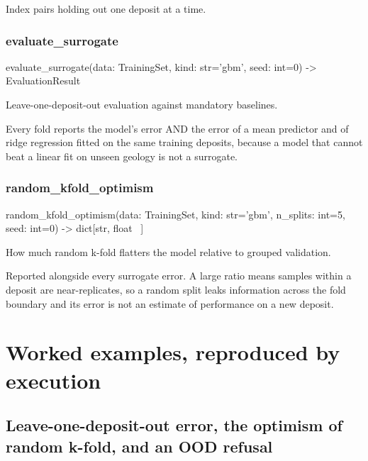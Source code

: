 \documentclass[10pt,a4paper,twoside]{report}
\begin{document}
Index pairs holding out one deposit at a time.

\subsubsection*{evaluate\_surrogate}

\begin{verbatimsmall}
evaluate_surrogate(data: TrainingSet, kind: str='gbm', seed: int=0) -> EvaluationResult
\end{verbatimsmall}

Leave-one-deposit-out evaluation against mandatory baselines.

Every fold reports the model's error AND the error of a mean predictor and of ridge regression fitted on the same training deposits, because a model that cannot beat a linear fit on unseen geology is not a surrogate.

\subsubsection*{random\_kfold\_optimism}

\begin{verbatimsmall}
random_kfold_optimism(data: TrainingSet, kind: str='gbm', n_splits: int=5, seed: int=0) -> dict[str, float
    \ ]
\end{verbatimsmall}

How much random k-fold flatters the model relative to grouped validation.

Reported alongside every surrogate error. A large ratio means samples within a deposit are near-replicates, so a random split leaks information across the fold boundary and its error is not an estimate of performance on a new deposit.

\section{Worked examples, reproduced by execution}

\subsection*{Leave-one-deposit-out error, the optimism of random k-fold, and an OOD refusal}
\end{document}
